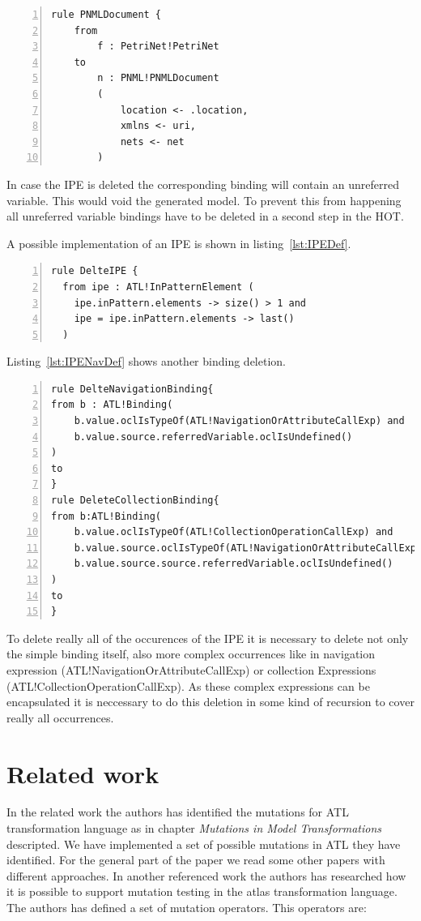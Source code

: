 \documentclass{llncs}
\begin{document}
\begin{lstlisting}[language=ATL, numbers=left,xleftmargin=5.0ex,label=lst:pnmldoc2]
rule PNMLDocument {
	from
		f : PetriNet!PetriNet
	to	
		n : PNML!PNMLDocument
		(
			location <- .location,
			xmlns <- uri,
			nets <- net			
		)
\end{lstlisting}

In case the IPE is deleted the corresponding binding will contain an unreferred variable. This would void the generated model. To prevent this from happening all unreferred variable bindings have to be deleted in a second step in the HOT.

A possible implementation of an IPE is shown in listing~\ref{lst:IPEDef}.

\begin{lstlisting}[language=ATL, numbers=left,xleftmargin=5.0ex,label=lst:IPEDef]
rule DelteIPE {
  from ipe : ATL!InPatternElement (
    ipe.inPattern.elements -> size() > 1 and
    ipe = ipe.inPattern.elements -> last()
  )
\end{lstlisting}

Listing~\ref{lst:IPENavDef} shows another binding deletion.

\begin{lstlisting}[language=ATL, numbers=left,xleftmargin=5.0ex,label=lst:IPENavDef]
rule DelteNavigationBinding{
from b : ATL!Binding(
	b.value.oclIsTypeOf(ATL!NavigationOrAttributeCallExp) and 
	b.value.source.referredVariable.oclIsUndefined()
)
to
}
rule DeleteCollectionBinding{
from b:ATL!Binding(		
	b.value.oclIsTypeOf(ATL!CollectionOperationCallExp) and 
	b.value.source.oclIsTypeOf(ATL!NavigationOrAttributeCallExp) and 
	b.value.source.source.referredVariable.oclIsUndefined()
)
to
}
\end{lstlisting}

To delete really all of the occurences of the IPE it is necessary to delete not only the simple binding itself, also more complex occurrences like in navigation expression (ATL!NavigationOrAttributeCallExp) or collection Expressions (ATL!CollectionOperationCallExp).
As these complex expressions can be encapsulated it is neccessary to do this deletion in some kind of recursion to cover really all occurrences.

\section{Related work}
In the related work \cite{troya:2015} the authors has identified the mutations
for ATL transformation language as in chapter \textit{Mutations in Model Transformations} descripted. We have implemented a set of possible mutations in ATL they have identified. For the general part of the paper we read some other papers with different approaches.
In another referenced work \cite{book:KhanHassine} the authors has researched
how it is possible to support mutation testing in the atlas transformation
language. The authors has defined a set of mutation operators. This operators
are:
\end{document}
